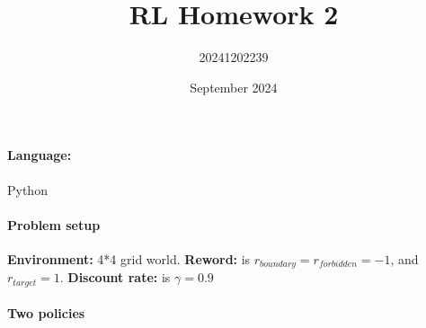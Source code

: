 \documentclass[UTF8]{ctexart}
\title{RL Homework 2}
\author{20241202239}
\date{September 2024}
\begin{document}
	
	\maketitle
	\paragraph{Language:} Python
	
	\paragraph{Problem setup}
	\textbf{Environment:} 4*4 grid world.
	\textbf{Reword:} is $r_{boundary} = r_{forbidden}=-1$, and $r_{target}=1$. 
	\textbf{Discount rate:} is $\gamma =0.9$
	\paragraph{Two policies}
	
\end{document}
